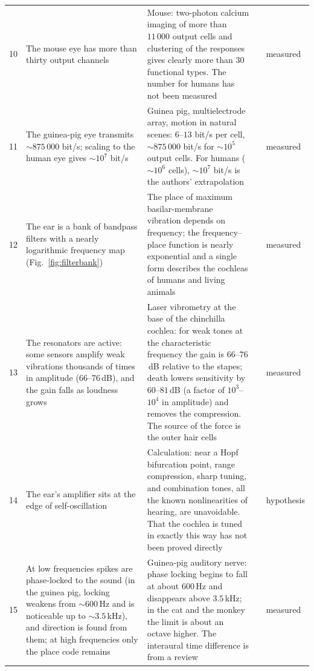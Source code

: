{\begin{longtable}{>{\raggedright}p{0.5cm}>{\raggedright}p{4.0cm}>{\raggedright}p{5.6cm}>{\raggedright}p{2.3cm}>{\raggedright\arraybackslash}p{1.7cm}}
10 & The mouse eye has more than thirty output channels & Mouse: two-photon calcium imaging of more than $11\,000$ output cells and clustering of the responses gives clearly more than $30$ functional types. The number for humans has not been measured & \cite{Baden2016} & measured \\
11 & The guinea-pig eye transmits $\sim875\,000$ bit/s; scaling to the human eye gives $\sim10^7$ bit/s & Guinea pig, multielectrode array, motion in natural scenes: $6$--$13$ bit/s per cell, $\sim875\,000$ bit/s for $\sim10^5$ output cells. For humans ($\sim10^6$ cells), $\sim10^7$ bit/s is the authors' extrapolation & \cite{Koch2006} & measured \\
12 & The ear is a bank of bandpass filters with a nearly logarithmic frequency map (Fig.~\ref{fig:filterbank}) & The place of maximum basilar-membrane vibration depends on frequency; the frequency--place function is nearly exponential and a single form describes the cochleas of humans and living animals & \cite{Greenwood1990,Robles2001} & measured \\
13 & The resonators are active: some sensors amplify weak vibrations thousands of times in amplitude ($66$--$76$\,dB), and the gain falls as loudness grows & Laser vibrometry at the base of the chinchilla cochlea: for weak tones at the characteristic frequency the gain is $66$--$76$\,dB relative to the stapes; death lowers sensitivity by $60$--$81$\,dB (a factor of $10^3$--$10^4$ in amplitude) and removes the compression. The source of the force is the outer hair cells & \cite{Ruggero1997,Robles2001} & measured \\
14 & The ear's amplifier sits at the edge of self-oscillation & Calculation: near a Hopf bifurcation point, range compression, sharp tuning, and combination tones, all the known nonlinearities of hearing, are unavoidable. That the cochlea is tuned in exactly this way has not been proved directly & \cite{Eguiluz2000} & hypothesis \\
15 & At low frequencies spikes are phase-locked to the sound (in the guinea pig, locking weakens from $\sim600$\,Hz and is noticeable up to $\sim3.5$\,kHz), and direction is found from them; at high frequencies only the place code remains & Guinea-pig auditory nerve: phase locking begins to fall at about $600$\,Hz and disappears above $3.5$\,kHz; in the cat and the monkey the limit is about an octave higher. The interaural time difference is from a review & \cite{PalmerRussell1986,Grothe2010} & measured \\

\end{longtable}}
